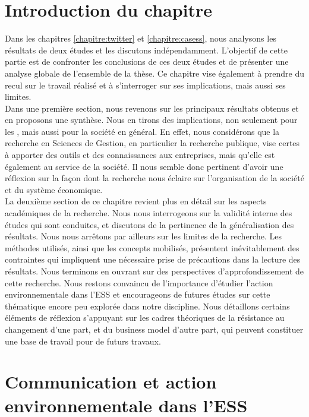 
\section*{Introduction du chapitre}

  Dans les chapitres \ref{chapitre:twitter} et \ref{chapitre:casess}, nous analysons les résultats de deux études et les discutons indépendamment. L'objectif de cette partie est de confronter les conclusions de ces deux études et de présenter une analyse globale de l'ensemble de la thèse. Ce chapitre vise également à prendre du recul sur le travail réalisé et à s'interroger sur ses implications, mais aussi ses limites. \\

  Dans une première section, nous revenons sur les principaux résultats obtenus et en proposons une synthèse. Nous en tirons des implications, non seulement pour les \eess, mais aussi pour la société en général. En effet, nous considérons que la recherche en Sciences de Gestion, en particulier la recherche publique, vise certes à apporter des outils et des connaissances aux entreprises, mais qu'elle est également au service de la société. Il nous semble donc pertinent d'avoir une réflexion sur la façon dont la recherche nous éclaire sur l'organisation de la société et du système économique. \\

  La deuxième section de ce chapitre revient plus en détail sur les aspects académiques de la recherche. Nous nous interrogeons sur la validité interne des études qui sont conduites, et discutons de la pertinence de la généralisation des résultats. Nous nous arrêtons par ailleurs sur les limites de la recherche. Les méthodes utilisés, ainsi que les concepts mobilisés, présentent inévitablement des contraintes qui impliquent une nécessaire prise de précautions dans la lecture des résultats. Nous terminons en ouvrant sur des perspectives d'approfondissement de cette recherche. Nous restons convaincu de l'importance d'étudier l'action environnementale dans l'ESS et encourageons de futures études sur cette thématique encore peu explorée dans notre discipline. Nous détaillons certains éléments de réflexion s'appuyant sur les cadres théoriques de la résistance au changement d'une part, et du business model d'autre part, qui peuvent constituer une base de travail pour de futurs travaux.

\section{Communication et action environnementale dans l'ESS}

